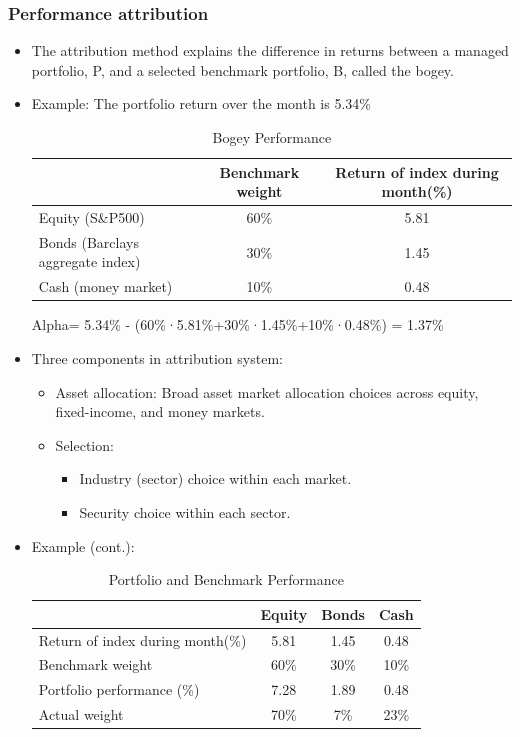 \subsubsection{Performance attribution}
\begin{itemize}
\item The attribution method explains the difference in returns between a managed portfolio, P, and a selected benchmark portfolio, B, called the bogey.
\item Example: The portfolio return over the month is 5.34\%
\begin{table}[H]
    \centering
    \caption{Bogey Performance}
    \begin{tabular}{@{}lcc@{}}
        \toprule
        & Benchmark weight & Return of index during month(\%) \\
        \midrule
        Equity (S\&P500) & 60\% & 5.81 \\
        Bonds (Barclays aggregate index) & 30\% & 1.45 \\
        Cash (money market) & 10\% & 0.48 \\
        \bottomrule
    \end{tabular}
\end{table}

Alpha= 5.34\% - (60\%·5.81\%+30\%·1.45\%+10\%·0.48\%) = 1.37\%

\item Three components in attribution system:
    \begin{itemize}
    \item Asset allocation: Broad asset market allocation choices across equity, fixed-income, and money markets.
    \item Selection:
        \begin{itemize}
        \item Industry (sector) choice within each market.
        \item Security choice within each sector.
        \end{itemize}  
    \end{itemize}

\item Example (cont.):
\begin{table}[h]
    \centering
    \caption{Portfolio and Benchmark Performance}
    \begin{tabular}{@{}lccc@{}}
        & Equity & Bonds & Cash \\
        \midrule
        Return of index during month(\%) & 5.81 & 1.45 & 0.48 \\
        Benchmark weight & 60\% & 30\% & 10\% \\
        Portfolio performance (\%) & 7.28 & 1.89 & 0.48 \\
        Actual weight & 70\% & 7\% & 23\% \\
        \bottomrule
    \end{tabular}
\end{table}


\end{itemize}
